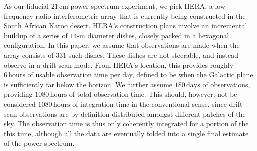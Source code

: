\documentclass[twocolumn,aps,prd,nofootinbib,showpacs,superscriptaddress]{revtex4-1}
\begin{document}
As our fiducial $21\,\textrm{cm}$ power spectrum experiment, we pick HERA, a low-frequency radio interferometric array that is currently being constructed in the South African Karoo desert. HERA's construction plans involve an incremental buildup of a series of $14$-m diameter dishes, closely packed in a hexagonal configuration. In this paper, we assume that observations are made when the array consists of $331$ such dishes. These dishes are not steerable, and instead observe in a drift-scan mode. From HERA's location, this provides roughly $6\,\textrm{hours}$ of usable observation time per day, defined to be when the Galactic plane is sufficiently far below the horizon. We further assume $180\,\textrm{days}$ of observations, providing $1080\,\textrm{hours}$ of total observation time. This should, however, not be considered $1080\,\textrm{hours}$ of integration time in the conventional sense, since drift-scan observations are by definition distributed amongst different patches of the sky. The observation time is thus only coherently integrated for a portion of the this time, although all the data are eventually folded into a single final estimate of the power spectrum.
\end{document}
